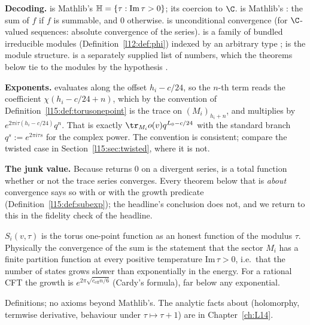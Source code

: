 \begin{dictionary}
\textbf{Decoding.}  is Mathlib's $\mathbb{H}=\{\tau:\mathrm{Im}\,\tau>0\}$;  its
coercion to $\C$.  is Mathlib's : the sum of $f$ if $f$ is summable, and $0$
otherwise.  is unconditional convergence (for $\C$-valued sequences: absolute convergence of the
series).  is a family of bundled irreducible modules (Definition~\ref{l12:def:phi}) indexed
by an arbitrary type ;  is the module structure.  is a separately supplied
list of numbers, which the theorems below tie to the modules by the hypothesis
.

\textbf{Exponents.}  evaluates along the offset $h_i-c/24$, so the $n$-th term reads the coefficient
$\chi(h_i-c/24+n)$, which by the convention of Definition~\ref{l15:def:torusonepoint} is the trace on
$(M_i)_{h_i+n}$, and multiplies by $e^{2\pi i\tau(h_i-c/24)}q^n$. That is exactly
$\tr_{M_i}o(v)q^{L_0-c/24}$ with the standard branch $q^{s}:=e^{2\pi i\tau s}$ for the complex power. The convention is
consistent; compare the twisted case in Section~\ref{l15:sec:twisted}, where it is not.

\textbf{The junk value.} Because  returns $0$ on a divergent series,  is a total function
whether or not the trace series converges. Every theorem below that is \emph{about} convergence says so with
 or with the growth predicate  (Definition~\ref{l15:def:subexp}); the headline's
conclusion does not, and we return to this in the fidelity check of the headline.
\end{dictionary}

\begin{physics}
$S_i(v,\tau)$ is the torus one-point function as an honest function of the modulus $\tau$. Physically the convergence
of the sum is the statement that the sector $M_i$ has a finite partition function at every positive temperature
$\mathrm{Im}\,\tau>0$, i.e.\ that the number of states grows slower than exponentially in the energy. For a rational CFT
the growth is $e^{2\pi\sqrt{c_{\mathrm{eff}}n/6}}$ (Cardy's formula), far below any exponential.
\end{physics}

\begin{status}
Definitions; no axioms beyond Mathlib's. The analytic facts about  (holomorphy, termwise derivative,
behaviour under $\tau\mapsto\tau+1$) are in Chapter~\ref{ch:L14}.
\end{status}


